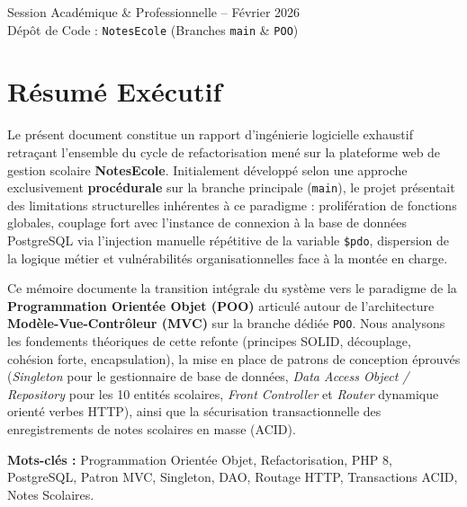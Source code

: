 \documentclass[11pt,a4paper,oneside]{report}
\begin{document}
\begin{titlepage}
    \vspace{1.5cm}

    \begin{center}
        \small \color{gray}
        Session Académique \& Professionnelle -- Février 2026\\
        Dépôt de Code : \texttt{NotesEcole} (Branches \texttt{main} \& \texttt{POO})
    \end{center}
\end{titlepage}

\chapter*{Résumé Exécutif}

Le présent document constitue un rapport d'ingénierie logicielle exhaustif retraçant l'ensemble du cycle de refactorisation mené sur la plateforme web de gestion scolaire \textbf{NotesEcole}. Initialement développé selon une approche exclusivement \textbf{procédurale} sur la branche principale (\texttt{main}), le projet présentait des limitations structurelles inhérentes à ce paradigme : prolifération de fonctions globales, couplage fort avec l'instance de connexion à la base de données PostgreSQL via l'injection manuelle répétitive de la variable \texttt{\$pdo}, dispersion de la logique métier et vulnérabilités organisationnelles face à la montée en charge.

Ce mémoire documente la transition intégrale du système vers le paradigme de la \textbf{Programmation Orientée Objet (POO)} articulé autour de l'architecture \textbf{Modèle-Vue-Contrôleur (MVC)} sur la branche dédiée \texttt{POO}. Nous analysons les fondements théoriques de cette refonte (principes SOLID, découplage, cohésion forte, encapsulation), la mise en place de patrons de conception éprouvés (\textit{Singleton} pour le gestionnaire de base de données, \textit{Data Access Object / Repository} pour les 10 entités scolaires, \textit{Front Controller} et \textit{Router} dynamique orienté verbes HTTP), ainsi que la sécurisation transactionnelle des enregistrements de notes scolaires en masse (ACID).

\vspace{0.8cm}

\noindent \textbf{Mots-clés :} Programmation Orientée Objet, Refactorisation, PHP 8, PostgreSQL, Patron MVC, Singleton, DAO, Routage HTTP, Transactions ACID, Notes Scolaires.
\end{document}
